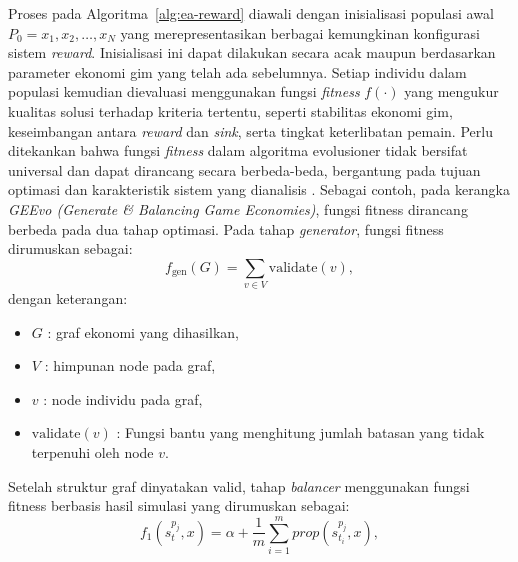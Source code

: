 Proses pada Algoritma~\ref{alg:ea-reward} diawali dengan inisialisasi populasi awal \(P_0={x_1,x_2,…,x_N}\) yang merepresentasikan berbagai kemungkinan konfigurasi sistem \textit{reward}. Inisialisasi ini dapat dilakukan secara acak maupun berdasarkan parameter ekonomi gim yang telah ada sebelumnya. Setiap individu dalam populasi kemudian dievaluasi menggunakan fungsi \textit{fitness} $f(\cdot)$ yang mengukur kualitas solusi terhadap kriteria tertentu, seperti stabilitas ekonomi gim, keseimbangan antara \textit{reward} dan \textit{sink}, serta tingkat keterlibatan pemain. Perlu ditekankan bahwa fungsi \textit{fitness} dalam algoritma evolusioner tidak bersifat universal dan dapat dirancang secara berbeda-beda, bergantung pada tujuan optimasi dan karakteristik sistem yang dianalisis \citep{Baresel2002Fitness}. Sebagai contoh, pada kerangka \textit{GEEvo (Generate \& Balancing Game Economies)},
fungsi fitness dirancang berbeda pada dua tahap optimasi. Pada tahap \textit{generator},
fungsi fitness dirumuskan sebagai:
\begin{equation}
f_{\text{gen}}(G) = \sum_{v \in V} \mathrm{validate}(v),
\end{equation}
dengan keterangan:
\begin{itemize}
    \item $G$ : graf ekonomi yang dihasilkan,
    \item $V$ : himpunan node pada graf,
    \item $v$ : node individu pada graf,
    \item $\mathrm{validate}(v)$ : Fungsi bantu yang menghitung jumlah batasan yang tidak terpenuhi oleh node $v$.
\end{itemize}

Setelah struktur graf dinyatakan valid, tahap \textit{balancer} menggunakan fungsi
fitness berbasis hasil simulasi yang dirumuskan sebagai:
\begin{equation}
    f_1(s^{p_j}_t, x) = \alpha + \frac{1}{m} \sum_{i=1}^{m} prop(s^{p_j}_{t_i}, x),
\end{equation}

